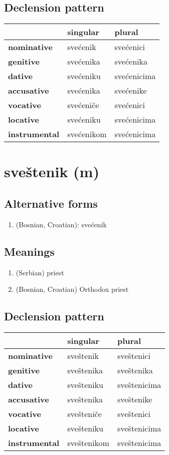 \subsection*{Declension pattern}
\begin{tabularx}{\linewidth}{Xll}
\toprule
{} &    singular &       plural \\
\midrule
\textbf{nominative  } &    svećenik &    svećenici \\
\textbf{genitive    } &   svećenika &    svećenika \\
\textbf{dative      } &   svećeniku &  svećenicima \\
\textbf{accusative  } &   svećenika &    svećenike \\
\textbf{vocative    } &   svećeniče &    svećenici \\
\textbf{locative    } &   svećeniku &  svećenicima \\
\textbf{instrumental} &  svećenikom &  svećenicima \\
\bottomrule
\end{tabularx}

\filbreak
\section{sveštenik (m)}
\subsection*{Alternative forms}
\begin{enumerate}
\item (Bosnian, Croatian): svećenik
\end{enumerate}
\subsection*{Meanings}
\begin{enumerate}
\item (Serbian) priest
\item (Bosnian, Croatian) Orthodox priest
\end{enumerate}
\subsection*{Declension pattern}
\begin{tabularx}{\linewidth}{Xll}
\toprule
{} &     singular &        plural \\
\midrule
\textbf{nominative  } &    sveštenik &    sveštenici \\
\textbf{genitive    } &   sveštenika &    sveštenika \\
\textbf{dative      } &   svešteniku &  sveštenicima \\
\textbf{accusative  } &   sveštenika &    sveštenike \\
\textbf{vocative    } &   svešteniče &    sveštenici \\
\textbf{locative    } &   svešteniku &  sveštenicima \\
\textbf{instrumental} &  sveštenikom &  sveštenicima \\
\bottomrule
\end{tabularx}

